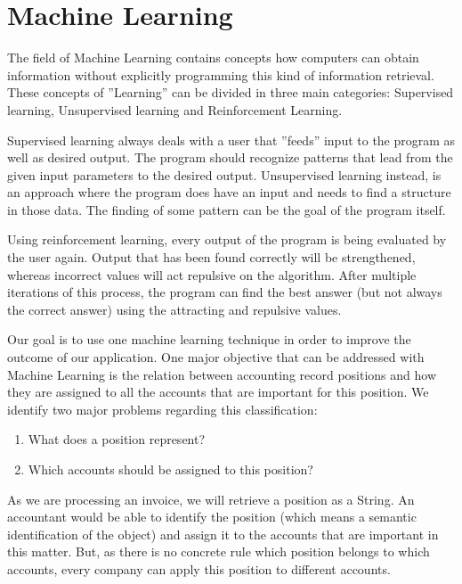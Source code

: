 %
% 
\chapter{Machine Learning}
\label{cha4}

The field of Machine Learning contains concepts how computers can obtain information without explicitly programming this kind of information retrieval. These concepts of ''Learning'' can be divided in three main categories: Supervised learning, Unsupervised learning and Reinforcement Learning.

Supervised learning always deals with a user that ''feeds'' input to the program as well as desired output. The program should recognize patterns that lead from the given input parameters to the desired output.
Unsupervised learning instead, is an approach where the program does have an input and needs to find a structure in those data. The finding of some pattern can be the goal of the program itself.

Using reinforcement learning, every output of the program is being evaluated by the user again. Output that has been found correctly will be strengthened, whereas incorrect values will act repulsive on the algorithm. After multiple iterations of this process, the program can find the best answer (but not always the correct answer) using the attracting and repulsive values.

Our goal is to use one machine learning technique in order to improve the outcome of our application. One major objective that can be addressed with Machine Learning is the relation between accounting record positions and how they are assigned to all the accounts that are important for this position.
We identify two major problems regarding this classification:
\begin{enumerate}
         \item What does a position represent?
         \item Which accounts should be assigned to this position?
\end{enumerate}
As we are processing an invoice, we will retrieve a position as a String. An accountant would be able to identify the position (which means a semantic identification of the object) and assign it to the accounts that are important in this matter. But, as there is no concrete rule which position belongs to which accounts, every company can apply this position to different accounts.

